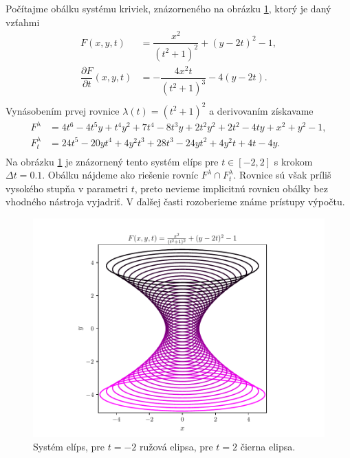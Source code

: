 \begin{example}
\label{example:too_complicated_equations}
Počítajme obálku systému kriviek, znázorneného na obrázku \ref{fig:too_complicated_equations}, ktorý je daný vzťahmi
\begin{align*}
F(x,y, t) &= \dfrac{x^2}{(t^2 + 1)^2} + (y - 2t)^2 - 1, \\
\dfrac{\partial F}{\partial t}(x, y, t) &= -\dfrac{4x^2t}{\left(t^2+1\right)^3}-4\left(y-2t\right). \\
\end{align*}
Vynásobením prvej rovnice $ \lambda(t) = (t^2 + 1)^2$ a derivovaním získavame
\begin{align*}
F^\lambda &= 4 t^6 - 4 t^5 y + t^4 y^2 + 7 t^4 - 8 t^3 y + 2 t^2 y^2 + 2 t^2 - 4 t y + x^2 + y^2 - 1, \\
F_t^\lambda &= 24t^5-20yt^4+4y^2t^3+28t^3-24yt^2+4y^2t+4t-4y. \\
\end{align*}
Na obrázku \ref{fig:too_complicated_equations} je znázornený tento systém elíps pre $t \in [-2,2]$ s krokom $\Delta t=0.1$. Obálku nájdeme ako riešenie rovníc $F^\lambda \cap F_t^\lambda. $ Rovnice sú však príliš vysokého stupňa v parametri $t$, preto nevieme implicitnú rovnicu obálky bez vhodného nástroja vyjadriť. V ďalšej časti rozoberieme známe prístupy výpočtu.
\end{example}

\begin{figure}[h]
	\centering
	\includegraphics[trim={0 0.35cm 0 0.85cm},clip, width=\textwidth]{images/too_complicated_equations.pdf}
	\caption[Systém elíps.]{Systém elíps, pre $t=-2$ ružová elipsa, pre $t=2$ čierna elipsa.}
	\label{fig:too_complicated_equations}
\end{figure}

